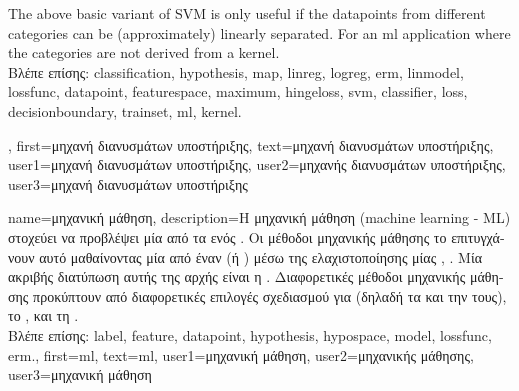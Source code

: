 {{\begin{figure}[H]
\begin{center}
				\label{fig_svm_gls_dict}
			\end{center}
		\end{figure}
		The above basic variant of SVM is only useful if the \gls{datapoint}s from different categories can be  
		(approximately) linearly separated. For an \gls{ml} application where the categories are not 
		derived from a \gls{kernel}.\\
		\foreignlanguage{greek}{Βλέπε επίσης:} \gls{classification}, \gls{hypothesis}, \gls{map}, \gls{linreg}, \gls{logreg}, \gls{erm}, \gls{linmodel}, 
		\gls{lossfunc}, \gls{datapoint}, \gls{featurespace}, \gls{maximum}, \gls{hingeloss}, \gls{svm}, \gls{classifier}, \gls{loss}, \gls{decisionboundary}, 
		\gls{trainset}, \gls{ml}, \gls{kernel}.},
	first={\foreignlanguage{greek}{μηχανή διανυσμάτων υποστήριξης}},
	text={\foreignlanguage{greek}{μηχανή διανυσμάτων υποστήριξης}},
	user1={\foreignlanguage{greek}{μηχανή διανυσμάτων υποστήριξης}}, %
	user2={\foreignlanguage{greek}{μηχανής διανυσμάτων υποστήριξης}}, %
	user3={\foreignlanguage{greek}{μηχανή διανυσμάτων υποστήριξης}} %
}

{name={\foreignlanguage{greek}{μηχανική μάθηση}},
	description={\foreignlanguage{greek}{Η μηχανική μάθηση} (machine learning - ML) 
		\foreignlanguage{greek}{στοχεύει να προβλέψει μία}  \foreignlanguage{greek}{από τα}  
		\foreignlanguage{greek}{ενός} . \foreignlanguage{greek}{Οι μέθοδοι μηχανικής μάθησης το επιτυγχάνουν αυτό 
	 	μαθαίνοντας μία}  \foreignlanguage{greek}{από έναν}  (\foreignlanguage{greek}{ή} ) 
	 	\foreignlanguage{greek}{μέσω της ελαχιστο\-ποί\-ησης μίας}  \cite{MLBasics}, \cite{HastieWainwrightBook}. 
	 	\foreignlanguage{greek}{Μία ακριβής διατύπωση αυτής της αρχής είναι η} . \foreignlanguage{greek}{Διαφορετικές 
		μέθοδοι μηχανικής μάθησης προκύπτουν από διαφορετικές επιλογές σχεδιασμού για}  (\foreignlanguage{greek}{δηλαδή 
		τα}  \foreignlanguage{greek}{και την}  \foreignlanguage{greek}{τους}), \foreignlanguage{greek}{το} 
	 	, \foreignlanguage{greek}{και τη}  \cite[\foreignlanguage{greek}{Κεφ.} 3]{MLBasics}.\\
	 	\foreignlanguage{greek}{Βλέπε επίσης:} \gls{label}, \gls{feature}, \gls{datapoint}, \gls{hypothesis}, \gls{hypospace}, \gls{model}, \gls{lossfunc}, \gls{erm}.},
	first={ml},
	text={ml},
	user1={\foreignlanguage{greek}{μηχανική μάθηση}}, %
	user2={\foreignlanguage{greek}{μηχανικής μά\-θη\-σης}}, %
	user3={\foreignlanguage{greek}{μηχανική μάθηση}} %
} 

